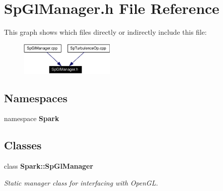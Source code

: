 \section{Sp\-Gl\-Manager.h File Reference}
\label{SpGlManager_8h}


This graph shows which files directly or indirectly include this file:\begin{figure}[H]
\begin{center}
\leavevmode
\includegraphics[width=130pt]{SpGlManager_8h__dep__incl}
\end{center}
\end{figure}
\subsection*{Namespaces}
\begin{CompactItemize}
\item 
namespace {\bf Spark}
\end{CompactItemize}
\subsection*{Classes}
\begin{CompactItemize}
\item 
class {\bf Spark::Sp\-Gl\-Manager}
\begin{CompactList}\small\item\em Static manager class for interfacing with Open\-GL. \item\end{CompactList}\end{CompactItemize}
